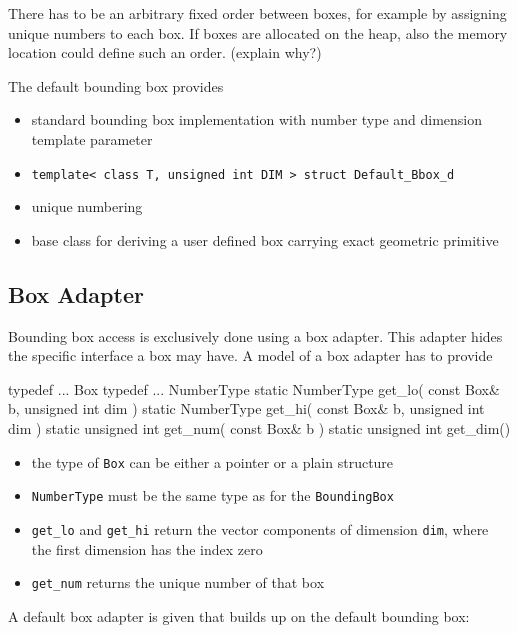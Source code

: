 There has to be an arbitrary fixed order between boxes, for example by assigning unique numbers to each box. If boxes are allocated on the heap, also the memory location could define such an order. (explain why?) 

The default bounding box provides
\begin{itemize} 
  \item standard bounding box implementation with number type and dimension template parameter
  \item \texttt{template< class T, unsigned int DIM > struct Default\_Bbox\_d}
  \item unique numbering
  \item base class for deriving a user defined box carrying exact geometric primitive
\end{itemize}


\subsection*{Box Adapter}
Bounding box access is exclusively done using a box adapter. This adapter hides the specific interface a box may have. A model of a box adapter has to provide
\begin{ccExampleCode}
  typedef ... Box
  typedef ... NumberType
  static NumberType get_lo( const Box& b, unsigned int dim )
  static NumberType get_hi( const Box& b, unsigned int dim )
  static unsigned int get_num( const Box& b )
  static unsigned int get_dim()
\end{ccExampleCode}

\begin{itemize}
 \item the type of \texttt{Box} can be either a pointer or a plain structure
 \item \texttt{NumberType} must be the same type as for the \texttt{BoundingBox}
 \item \texttt{get\_lo} and \texttt{get\_hi} return the vector components of dimension \texttt{dim}, where the first  dimension has the index zero
 \item \texttt{get\_num} returns the unique number of that box
\end{itemize}

A default box adapter is given that builds up on the default bounding box:


